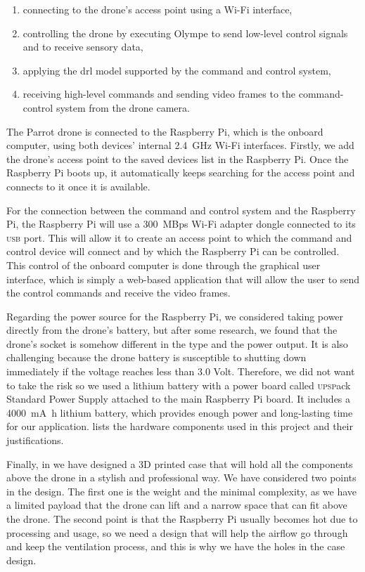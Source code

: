\documentclass[../main.tex]{subfiles}
\begin{document}
\begin{enumerate}
	\item connecting to the drone's access point 
	using a Wi-Fi interface,
	\item controlling the drone 
	by executing Olympe to send low-level control signals 
	and to receive sensory data,
	\item applying the \gls{drl} model supported by 
	the command and control system,
	\item receiving high-level commands and sending video 
	frames to the command-control system from the drone camera.
\end{enumerate}
 
The Parrot \anafi drone is connected 
to the Raspberry Pi, which is the onboard computer,
using both devices' internal 
\SI{2.4}{\giga\hertz}
Wi-Fi interfaces. 
Firstly, we add the \anafi drone's access point 
to the saved devices list in the Raspberry Pi.
Once the Raspberry Pi boots up, it automatically keeps 
searching for the access point and connects 
to it once it is available.

For the connection between the command and control system 
and the Raspberry Pi, 
the Raspberry Pi will use a 
\SI[per-mode=symbol,per-symbol=p]{300}{MBps} 
Wi-Fi adapter dongle connected to 
its \textsc{usb} port. 
This will allow it to create an access point to which 
the command and control device will connect and by which 
the Raspberry Pi can be controlled. This control of the 
onboard computer is done through the graphical user interface,
which is simply a web-based application 
that will allow the user to send the
control commands and receive the video frames. 


Regarding the power source for the Raspberry Pi, 
we considered taking power directly from the 
drone's battery, but after some research, we found 
that the \anafi drone's  
socket is somehow different in the type and the power output. It is also challenging 
because the drone battery is susceptible to shutting down 
immediately if the voltage reaches less than 3.0 Volt. 
Therefore, we did not want to take the risk so we used a 
lithium battery with a power board called 
\textsc{upsp}ack Standard Power Supply attached to 
the main Raspberry Pi board. It includes a 
\SI{4000}{\milli\ampere\hour}
lithium battery, which provides enough power 
and long-lasting time for our application.
 lists the hardware components
used in this project and their justifications. 

Finally, in  we have designed a 3D printed case that 
will hold all the components above the drone in 
a stylish and professional way. We have considered two 
points in the design. The first one is the weight and the minimal
complexity, as we have a limited payload that the drone 
can lift and a narrow space that can fit above the drone.
The second point is that the Raspberry Pi usually 
becomes hot due to processing and usage, so we need 
a design that will help the airflow go through and keep 
the ventilation process, and this is why we have 
the holes in the case design.   
\end{document}
